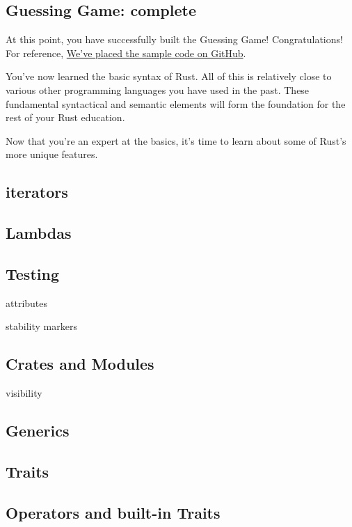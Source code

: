 \documentclass[]{article}
\begin{document}
\subsection{Guessing Game: complete}\label{guessing-game-complete}

At this point, you have successfully built the Guessing Game!
Congratulations! For reference,
\href{https://github.com/steveklabnik/guessing_game}{We've placed the
sample code on GitHub}.

You've now learned the basic syntax of Rust. All of this is relatively
close to various other programming languages you have used in the past.
These fundamental syntactical and semantic elements will form the
foundation for the rest of your Rust education.

Now that you're an expert at the basics, it's time to learn about some
of Rust's more unique features.

\subsection{iterators}\label{iterators}

\subsection{Lambdas}\label{lambdas}

\subsection{Testing}\label{testing}

attributes

stability markers

\subsection{Crates and Modules}\label{crates-and-modules}

visibility

\subsection{Generics}\label{generics}

\subsection{Traits}\label{traits}

\subsection{Operators and built-in
Traits}\label{operators-and-built-in-traits}
\end{document}
